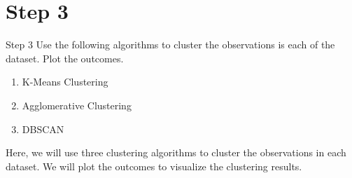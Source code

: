 \section*{Step 3}

\begin{custombox}[label={box:Q3}]{Step 3}
	Use the following algorithms to cluster the observations is each of the dataset. Plot the outcomes.
	\begin{enumerate}[label=\alph*.]
		\item K-Means Clustering
		\item Agglomerative Clustering
		\item DBSCAN
	\end{enumerate}
\end{custombox}

Here, we will use three clustering algorithms to cluster the observations in each dataset. We will plot the outcomes to visualize the clustering results.

